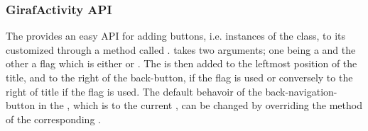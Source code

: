 \subsubsection{GirafActivity API}

The  provides an easy API for adding \giraf buttons, i.e. instances of the  class, to its customized  through a method called .  takes two arguments; one being a  and the other a flag which is either  or . The  is then added to the leftmost position of the title, and to the right of the back-button, if the  flag is used or conversely to the right of title if the  flag is used. 
The default behavoir of the back-navigation-button in the , which is to  the current , can be changed by overriding the  method of the corresponding .          
